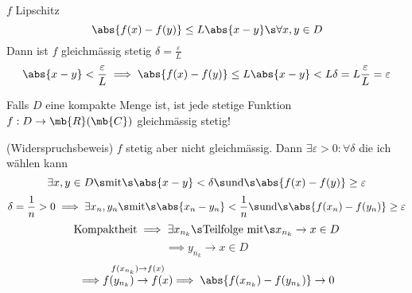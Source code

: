 \begin{Bsp}
  $f$ Lipschitz
  \[\abs{f(x)-f(y)}\leq L\abs{x-y}\s\forall x,y\in D\]
  Dann ist $f$ gleichmässig stetig $\delta=\frac{\varepsilon}{L}$
  \[\abs{x-y}<\frac{\varepsilon}{L}\implies \abs{f(x)-f(y)}\leq L\abs{x-y}<L \delta=L\frac{\varepsilon}{L}=\varepsilon\]
\end{Bsp}
\begin{Sat}
  Falls $D$ eine kompakte Menge ist, ist jede stetige Funktion $f:D\to \mb{R}(\mb{C})$ gleichmässig stetig!
\end{Sat}
\begin{Bew}
  (Widerspruchsbeweis) $f$ stetig aber nicht gleichmässig. Dann $\exists \varepsilon>0:\forall \delta$ die ich wählen kann
  \[\exists x,y\in D\s\text{mit}\s\abs{x-y}<\delta\s\text{und}\s\abs{f(x)-f(y)}\geq \varepsilon\]
  \[\delta=\frac{1}{n}>0\implies\exists x_n,y_n\s\text{mit}\s\abs{x_n-y_n}<\frac{1}{n}\s\text{und}\s\abs{f(x_n)-f(y_n)}\geq \varepsilon\]
  \[\text{Kompaktheit}\implies\exists x_{n_k}\s\text{Teilfolge mit}\s x_{n_k}\to x\in D\]
  \[\implies y_{n_k}\to x\in D\]
  \[\implies \stackrel{f(x_{n_k})\to f(x)}{f(y_{n_k})\to f(x)}\implies \abs{f(x_{n_k})-f(y_{n_k})}\to 0\]
\end{Bew}
